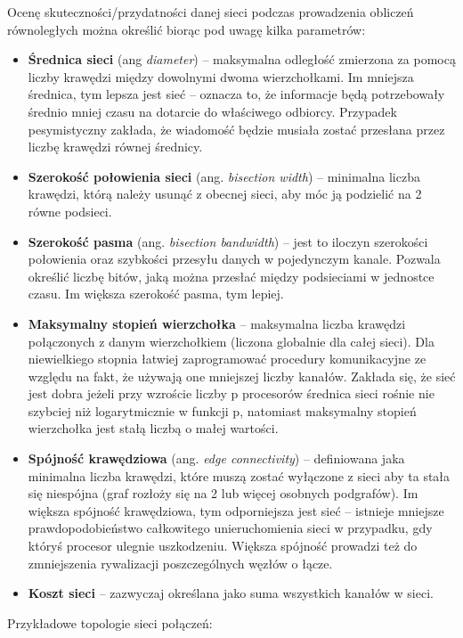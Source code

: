 Ocenę skuteczności/przydatności danej sieci podczas prowadzenia obliczeń równoległych można określić biorąc pod uwagę kilka parametrów:

\begin{itemize}
	\item \textbf{Średnica sieci} (ang \textit{diameter}) -- maksymalna odległość zmierzona za pomocą liczby krawędzi między dowolnymi dwoma wierzchołkami. Im mniejsza średnica, tym lepsza jest sieć -- oznacza to, że informacje będą potrzebowały średnio mniej czasu na dotarcie do właściwego odbiorcy. Przypadek pesymistyczny zakłada, że wiadomość będzie musiała zostać przesłana przez liczbę krawędzi równej średnicy.
	\item \textbf{Szerokość połowienia sieci} (ang. \textit{bisection width}) -- minimalna liczba krawędzi, którą należy usunąć z obecnej sieci, aby móc ją podzielić na 2 równe podsieci.
	\item \textbf{Szerokość pasma} (ang. \textit{bisection bandwidth}) -- jest to iloczyn szerokości połowienia oraz szybkości przesyłu danych w pojedynczym kanale. Pozwala określić liczbę bitów, jaką można przesłać między podsieciami w jednostce czasu. Im większa szerokość pasma, tym lepiej.
	\item \textbf{Maksymalny stopień wierzchołka} -- maksymalna liczba krawędzi połączonych z danym wierzchołkiem (liczona globalnie dla całej sieci). Dla niewielkiego stopnia łatwiej zaprogramować procedury komunikacyjne ze względu na fakt, że używają one mniejszej liczby kanałów. Zakłada się, że sieć jest dobra jeżeli przy wzroście liczby p procesorów średnica sieci rośnie nie szybciej niż logarytmicznie w funkcji p, natomiast maksymalny stopień wierzchołka jest stałą liczbą o małej wartości.
	\item \textbf{Spójność krawędziowa} (ang. \textit{edge connectivity}) -- definiowana jaka minimalna liczba krawędzi, które muszą zostać wyłączone z sieci aby ta stała się niespójna (graf rozłoży się na 2 lub więcej osobnych podgrafów). Im większa spójność krawędziowa, tym odporniejsza jest sieć -- istnieje mniejsze prawdopodobieństwo całkowitego unieruchomienia sieci w przypadku, gdy któryś procesor ulegnie uszkodzeniu. Większa spójność prowadzi też do zmniejszenia rywalizacji poszczególnych węzłów o łącze.
	\item \textbf{Koszt sieci} -- zazwyczaj określana jako suma wszystkich kanałów w sieci.
\end{itemize}

Przykładowe topologie sieci połączeń:

